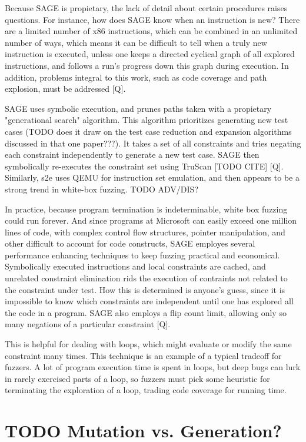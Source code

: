 \documentclass[11pt,expanded,copyright]{fsuthesis}
\begin{document}
Because SAGE is propietary, the lack of detail about certain procedures raises questions. For instance, how does SAGE know when an instruction is new? There are a limited number of x86 instructions, which can be combined in an unlimited number of ways, which means it can be difficult to tell when a truly new instruction is executed, unless one keeps a directed cyclical graph of all explored instructions, and follows a run's progress down this graph during execution. In addition, problems integral to this work, such as code coverage and path explosion, must be addressed [Q].

SAGE uses symbolic execution, and prunes paths taken with a propietary "generational search" algorithm. This algorithm prioritizes generating new test cases (TODO does it draw on the test case reduction and expansion algorithms discussed in that one paper???). It takes a set of all constraints and tries negating each constraint independently to generate a new test case. SAGE then symbolically re-executes the constraint set using TruScan [TODO CITE] [Q]. Similarly, s2e uses QEMU for instruction set emulation, and then appears to be a strong trend in white-box fuzzing. TODO ADV/DIS?

In practice, because program termination is indeterminable, white box fuzzing could run forever. And since programs at Microsoft can easily exceed one million lines of code, with complex control flow structures, pointer manipulation, and other difficult to account for code constructs, SAGE employes several performance enhancing techniques to keep fuzzing practical and economical. Symbolically executed instructions and local constraints are cached, and unrelated constraint elimination rids the execution of contraints not related to the constraint under test. How this is determined is anyone's guess, since it is impossible to know which constraints are independent until one has explored all the code in a program. SAGE also employs a flip count limit, allowing only so many negations of a particular constraint [Q]. 

This is helpful for dealing with loops, which might evaluate or modify the same constraint many times. This technique is an example of a typical tradeoff for fuzzers. A lot of program execution time is spent in loops, but deep bugs can lurk in rarely exercised parts of a loop, so fuzzers must pick some heuristic for terminating the exploration of a loop, trading code coverage for running time.


\section{TODO Mutation vs. Generation?}
\end{document}

